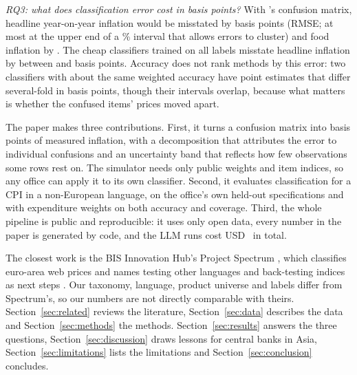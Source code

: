 \emph{RQ3: what does classification error cost in basis points?} With \NameOpus's confusion
matrix, headline year-on-year inflation would be misstated by \BpYoyRmseHeadlineOpus{} basis
points (RMSE; at most \BpYoyRmseHeadlineOpusClusterHi{} at the upper end of a \CfgCI\%
interval that allows errors to cluster) and food inflation by \BpYoyRmseFoodOpus. The cheap
classifiers trained on all labels misstate headline inflation by between
\BpYoyRmseHeadlineBgeMLP{} and \BpYoyRmseHeadlineEfiveMLP{} basis points. Accuracy does not rank
methods by this error: two classifiers with about the same weighted accuracy have point
estimates that differ several-fold in basis points, though their intervals overlap, because
what matters is whether the confused items' prices moved apart.

The paper makes three contributions. First, it turns a confusion matrix into basis points of
measured inflation, with a decomposition that attributes the error to individual confusions
and an uncertainty band that reflects how few observations some rows rest on. The simulator
needs only public weights and item indices, so any office can apply it to its own
classifier. Second, it evaluates classification for a CPI in a non-European language, on
the office's own held-out specifications and with expenditure weights on both accuracy and
coverage. Third, the whole pipeline is public and reproducible: it uses only open data, every
number in the paper is generated by code, and the LLM runs cost USD~\LLMSpendUSD{} in total.

The closest work is the BIS Innovation Hub's Project Spectrum \citep{bis2026spectrum}, which
classifies euro-area web prices and names testing other languages and back-testing indices as
next steps \citep[p.~30]{bis2026spectrum}. Our taxonomy, language, product universe and
labels differ from Spectrum's, so our numbers are not directly comparable with theirs.
Section~\ref{sec:related} reviews the literature, Section~\ref{sec:data} describes the data
and Section~\ref{sec:methods} the methods. Section~\ref{sec:results} answers the three
questions, Section~\ref{sec:discussion} draws lessons for central banks in Asia,
Section~\ref{sec:limitations} lists the limitations and Section~\ref{sec:conclusion}
concludes.
